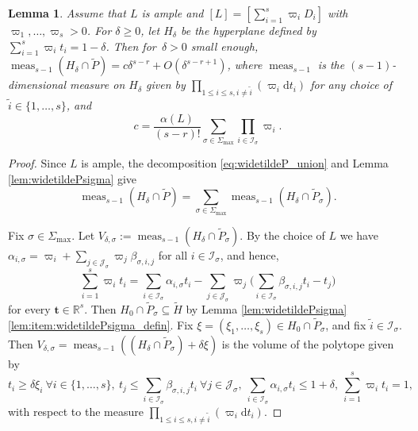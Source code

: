 \documentclass[11pt]{article}
\numberwithin{equation}{section}
\newcommand{\bft}{\boldsymbol{t}}
\newcommand\RR{\mathbb{R}}
\newcommand{\ii}[1]{\mathcal{J}_{#1}}
\newcommand{\ic}[1]{\mathcal{I}_{#1}}
\DeclareMathOperator{\meas}{meas}
\newtheorem{lemma}[theorem]{Lemma}
\theoremstyle{definition}
\numberwithin{theorem}{section}
\begin{document}
\begin{lemma}
\label{lem:alpha_constant}
Assume that $L$ is ample and $[L]\!=\![\sum_{i=1}^s\varpi_i D_i]$ with \hbox{$\varpi_1,\dots,\varpi_s\!>\!0$}.
For $\delta\geq0$, let $H_\delta$ be the hyperplane defined by $\sum_{i=1}^s\varpi_i t_i\!=\!1\!-\!\delta$.
Then for~\hbox{$\delta\!>\!0$} small enough,
$\meas_{s-1}(H_\delta\cap\widetilde P)= c \delta^{s-r} +O(\delta^{s-r+1})$, where
$\meas_{s-1}$ is the \hbox{$(s-1)$}\nobreakdash-dimen\-sional measure on $H_\delta$ given by
$\prod_{1\leq i\leq s, i\neq\tilde i}(\varpi_i\mathrm dt_i)$
for any choice of $\tilde i\in\{1,\dots,s\}$, and
\[
c=\frac{\alpha(L)}{(s-r)!}\sum_{\sigma\in\Sigma_{\max}}\prod_{i\in\ic{\sigma}}\varpi_i.
\]
\end{lemma}
\begin{proof}
Since $L$ is ample, the decomposition \eqref{eq:widetildeP_union}
and Lemma \ref{lem:widetildePsigma} give
\[
\meas_{s-1}(H_\delta\cap\widetilde P)
= \sum_{\sigma\in\Sigma_{\max}}\meas_{s-1}(H_\delta\cap\widetilde P_\sigma).
\]

Fix $\sigma \in\Sigma_{\max}$.
Let $V_{\delta, \sigma}:=\meas_{s-1}(H_\delta\cap\widetilde P_\sigma)$.
By the choice of $L$ we have
$\alpha_{i,\sigma}=\varpi_i+\sum_{j\in\ii{\sigma}}\varpi_j\beta_{\sigma,i,j}$ for all $i\in\ic{\sigma}$,
and hence,
\[
\sum_{i=1}^s\varpi_i t_i
=\sum_{i\in\ic{\sigma}}\alpha_{i,\sigma} t_i
-\sum_{j\in\ii{\sigma}}\varpi_j\biggl(\sum_{i\in\ic{\sigma}}\beta_{\sigma,i,j}t_i-t_j\biggr)
\]
for every $\bft \in\RR^s$.
Then $H_0\cap \widetilde P_\sigma\subseteq \widetilde H$
by Lemma \ref{lem:widetildePsigma}\eqref{lem:item:widetildePsigma_defin}.
Fix $\xi=(\xi_1,\dots,\xi_s)\in H_0\cap \widetilde P_\sigma$, and fix $\tilde i\in\ic{\sigma}$.
Then $V_{\delta,\sigma}=\meas_{s-1}((H_\delta\cap \widetilde P_\sigma)+\delta\xi)$
is the volume of the polytope given by
\[
t_i\geq \delta\xi_i \ \forall i\in\{1,\dots,s\}, \
t_{j}
\leq \sum_{i\in\ic{\sigma}} \beta_{\sigma, i,j}t_i
\ \forall j\in\ii{\sigma}, \
\sum_{i\in\ic{\sigma}} \alpha_{i,\sigma}t_i \leq 1+\delta, \ \sum_{i=1}^s\varpi_i t_i=1,
\]
with respect to the measure $\prod_{1\leq i\leq s, i\neq\tilde i}(\varpi_i\mathrm dt_i)$.


\end{proof}
\end{document}
